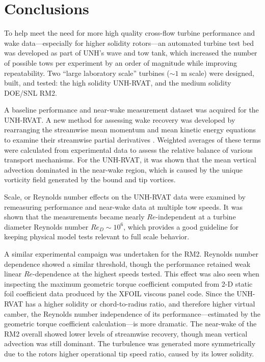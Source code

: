 \chapter{Conclusions}

To help meet the need for more high quality cross-flow turbine performance and
wake data---especially for higher solidity rotors---an automated turbine test
bed was developed as part of UNH's wave and tow tank, which increased the number
of possible tows per experiment by an order of magnitude while improving
repeatability. Two ``large laboratory scale'' turbines ($\sim 1$ m scale) were
designed, built, and tested: the high solidity UNH-RVAT, and the medium solidity
DOE/SNL RM2.

A baseline performance and near-wake measurement dataset was acquired for the
UNH-RVAT. A new method for assessing wake recovery was developed by rearranging
the streamwise mean momentum and mean kinetic energy equations to examine their
streamwise partial derivatives \cite{Bachant2015-JoT}. Weighted averages of
these terms were calculated from experimental data to assess the relative
balance of various transport mechanisms. For the UNH-RVAT, it was shown that the
mean vertical advection dominated in the near-wake region, which is caused by
the unique vorticity field generated by the bound and tip vortices.

Scale, or Reynolds number effects on the UNH-RVAT data were examined by
remeasuring performance and near-wake data at multiple tow speeds. It was shown
that the measurements became nearly $Re$-independent at a turbine diameter
Reynolds number $Re_D \sim 10^6$, which provides a good guideline for keeping
physical model tests relevant to full scale behavior.

A similar experimental campaign was undertaken for the RM2. Reynolds number
dependence showed a similar threshold, though the performance retained weak
linear $Re$-dependence at the highest speeds tested. This effect was also seen
when inspecting the maximum geometric torque coefficient computed from 2-D
static foil coefficient data produced by the XFOIL viscous panel code. Since the
UNH-RVAT has a higher solidity or chord-to-radius ratio, and therefore higher
virtual camber, the Reynolds number independence of its performance---estimated
by the geometric torque coefficient calculation---is more dramatic. The
near-wake of the RM2 overall showed lower levels of streamwise recovery, though
mean vertical advection was still dominant. The turbulence was generated more
symmetrically due to the rotors higher operational tip speed ratio, caused by
its lower solidity.

